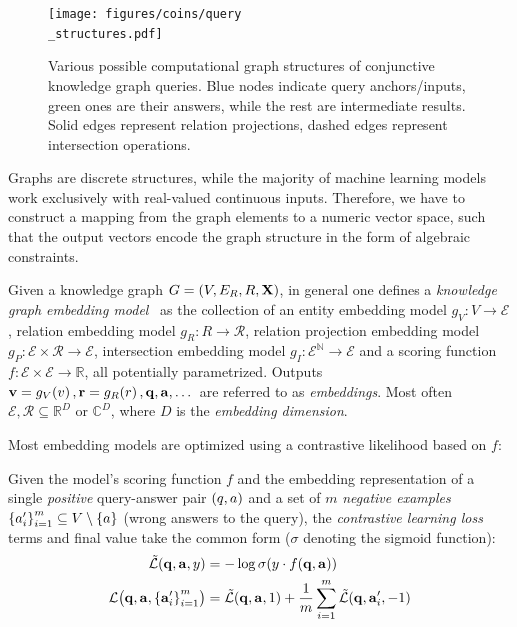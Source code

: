 \begin{figure}[!t]
    \centering
    \texttt{[image: figures/coins/query\\\_structures.pdf]}
    \caption[Various possible computational graph structures of conjunctive knowledge graph queries.]{Various possible computational graph structures of conjunctive knowledge graph queries. Blue nodes indicate query anchors/inputs, green ones are their answers, while the rest are intermediate results. Solid edges represent relation projections, dashed edges represent intersection operations.}
    \label{fig:query_structures}
\end{figure}

Graphs are discrete structures, while the majority of machine learning models work exclusively with real-valued continuous inputs. Therefore, we have to construct a mapping from the graph elements to a numeric vector space, such that the output vectors encode the graph structure in the form of algebraic constraints.
\begin{definition}
Given a knowledge graph $G = \mathopen{}\left(V, E_R, R, \mathbf{X}\right)$, in general one defines a \textit{knowledge graph embedding model}~\cite{ji_survey_2022,liang_survey_2024,ren_query2box_2020} as the collection of an entity embedding model $g_V: V \to \mathcal{E}$, relation embedding model $g_R: R \to \mathcal{R}$, relation projection embedding model $g_P: \mathcal{E} \times \mathcal{R} \to \mathcal{E}$, intersection embedding model $g_I: \mathcal{\mathcal{E}}^{\mathbb{N}} \to \mathcal{E}$ and a scoring function $f: \mathcal{E} \times \mathcal{E} \to \mathbb{R}$, all potentially parametrized. Outputs $\mathbf{v} = g_V\mathopen{}\left(v\right), \mathbf{r} = g_R\mathopen{}\left(r\right), \mathbf{q}, \mathbf{a}, \dots$ are referred to as \emph{embeddings}. Most often $\mathcal{E}, \mathcal{R} \subseteq \mathbb{R}^D$ or $\mathbb{C}^D$, where $D$ is the \emph{embedding dimension}. 
\end{definition}

Most embedding models are optimized using a contrastive likelihood based on $f$:
\begin{definition}
\label{def:contrastive_loss}
    Given the model's scoring function $f$ and the embedding representation of a single \emph{positive} query-answer pair $\mathopen{}\left(q, a\right)$ and a set of $m$ \emph{negative examples} $\mathopen{}\left\{a'_i\right\}_{i=1}^{m} \subseteq V \setminus \mathopen{}\left\{a\right\}$ (wrong answers to the query), the \emph{contrastive learning loss} terms and final value take the common form ($\sigma$ denoting the sigmoid function):
    \begin{align}
    \begin{split}
    \label{eq:contrastive_loss}
        \tilde{\mathcal{L}}\mathopen{}\left(\mathbf{q}, \mathbf{a}, y\right)&=-\log{\sigma{\mathopen{}\left(y \cdot f\mathopen{}\left(\mathbf{q},\mathbf{a}\right)\right)}}\\
        \mathcal{L}\mathopen{}\left(\mathbf{q}, \mathbf{a}, \mathopen{}\left\{\mathbf{a}'_i\right\}_{i=1}^{m}\right)&=\tilde{\mathcal{L}}\mathopen{}\left(\mathbf{q}, \mathbf{a}, 1\right) + \frac{1}{m}\sum_{i=1}^{m}{\tilde{\mathcal{L}}\mathopen{}\left(\mathbf{q}, \mathbf{a}'_i, -1\right)}
        \end{split}
    \end{align}
\end{definition}

